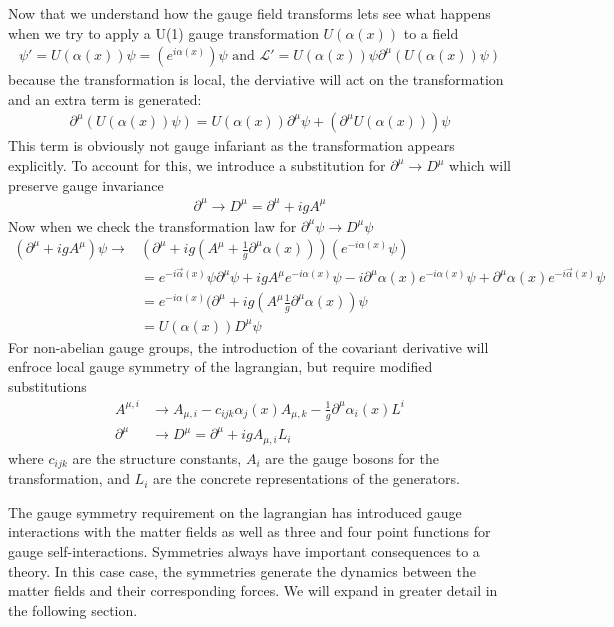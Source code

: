 Now that we understand how the gauge field transforms lets see what happens when we try to apply a U(1) gauge transformation $U(\alpha(x))$  to a field
\begin{align*}
\psi' = U(\alpha(x)) \psi = ( e^{i\alpha(x)})\psi \text{ and } \mathcal{L}' = U(\alpha(x))\psi \partial^\mu ( U(\alpha(x)) \psi)
\end{align*}
because the transformation is local, the derviative will act on the transformation and an extra term is generated:
\begin{align*}
\partial^\mu ( U(\alpha(x)) \psi) = U(\alpha(x)) \partial^\mu \psi + ( \partial^\mu U(\alpha(x))) \psi 
\end{align*}
This term is obviously not gauge infariant as the transformation appears explicitly. To account for this, we introduce a substitution for $\partial^\mu \rightarrow D^\mu $ which will preserve gauge invariance 
\begin{align*}
\partial^\mu \rightarrow D^\mu = \partial^\mu + igA^\mu
\end{align*}
Now when we check the transformation law for $\partial^\mu \psi\rightarrow D^\mu\psi$
\begin{align*}
(\partial^\mu + ig A^\mu ) \psi \rightarrow &(\partial^\mu + ig  (A^\mu +  \frac{1}{g} \partial^\mu \alpha(x)))( e^{-i \alpha(x) } \psi ) \\
&= e^{-i \vec \alpha(x) } \psi \partial^\mu \psi + ig A^\mu e^{-i\alpha(x)} \psi - i\partial^\mu \alpha(x) e^{-i \alpha(x)} \psi + \partial^\mu \alpha(x) e^{-i \vec \alpha(x)} \psi \\
&= e^{-i \alpha(x)} (\partial^\mu + ig  (A^\mu \frac{1}{g} \partial^\mu \alpha(x)) \psi \\
&= U(\alpha(x)) D^\mu \psi
\end{align*}
For non-abelian gauge groups, the introduction of the covariant derivative will enfroce local 
gauge symmetry of the lagrangian, but require modified substitutions
\begin{align*}
A^{\mu,i} &\rightarrow A_{\mu,i} -  c_{ijk} \alpha_j(x) A_{\mu,k} - \frac{1}{g} \partial^\mu \alpha_i(x)L^i\\
\partial^\mu &\rightarrow D^\mu =  \partial^\mu + igA_{\mu,i}L_i
\end{align*}
where $c_{ijk}$ are the structure constants, $A_i$ are the gauge bosons for the transformation, and $L_i$ are the 
concrete representations of the generators. 

The gauge symmetry requirement on the lagrangian has introduced gauge interactions with the matter fields as well
as three and four point functions for gauge self-interactions. Symmetries always have important consequences to a 
theory. In this case case, the symmetries generate the dynamics between the matter fields
 and their corresponding forces. We will expand in greater detail in the following section.

